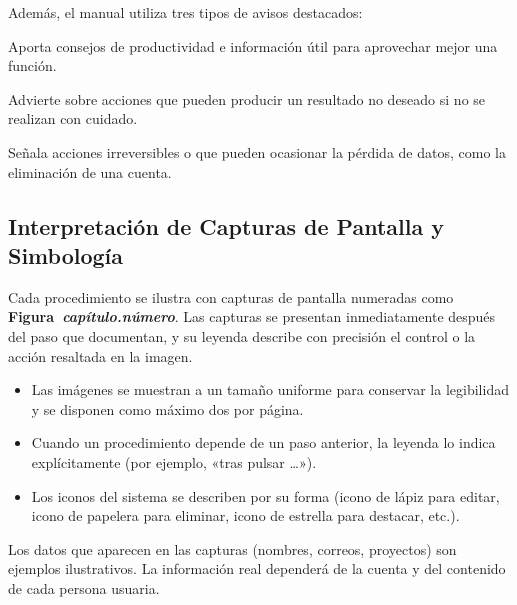 Además, el manual utiliza tres tipos de avisos destacados:

\begin{AvisoNota}
Aporta consejos de productividad e información útil para aprovechar mejor una función.
\end{AvisoNota}

\begin{AvisoPrecaucion}
Advierte sobre acciones que pueden producir un resultado no deseado si no se realizan
con cuidado.
\end{AvisoPrecaucion}

\begin{AvisoAdvertencia}
Señala acciones irreversibles o que pueden ocasionar la pérdida de datos, como la
eliminación de una cuenta.
\end{AvisoAdvertencia}

\subsection{Interpretación de Capturas de Pantalla y Simbología}
\label{subsec:capturas}

Cada procedimiento se ilustra con capturas de pantalla numeradas como
\textbf{Figura~\textit{capítulo.número}}. Las capturas se presentan inmediatamente
después del paso que documentan, y su leyenda describe con precisión el control o la
acción resaltada en la imagen.

\begin{itemize}[noitemsep]
    \item Las imágenes se muestran a un tamaño uniforme para conservar la legibilidad y
    se disponen como máximo dos por página.
    \item Cuando un procedimiento depende de un paso anterior, la leyenda lo indica
    explícitamente (por ejemplo, «tras pulsar \ldots»).
    \item Los iconos del sistema se describen por su forma (icono de lápiz para editar,
    icono de papelera para eliminar, icono de estrella para destacar, etc.).
\end{itemize}

\begin{NotaTecnica}
Los datos que aparecen en las capturas (nombres, correos, proyectos) son ejemplos
ilustrativos. La información real dependerá de la cuenta y del contenido de cada
persona usuaria.
\end{NotaTecnica}
